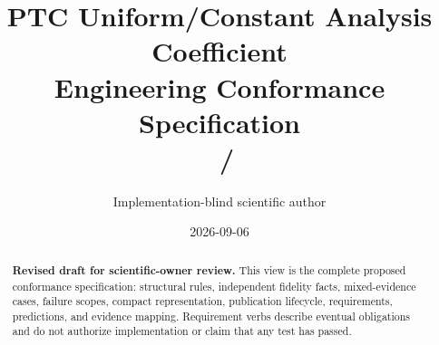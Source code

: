 \documentclass[10pt]{article}
\makeatletter
\def\ps@draftheadings{%
  \def\@oddhead{\normalfont\small Engineering Conformance Specification
    v0.1-draft.1/r0.4\hfil\thepage}%
  \let\@evenhead\@oddhead
  \def\@oddfoot{}\let\@evenfoot\@oddfoot}
\let\ps@plain\ps@draftheadings
\makeatother
\begin{document}
\makeatletter
\let\ps@plain\ps@draftheadings
\let\ps@headings\ps@draftheadings
\let\ps@myheadings\ps@draftheadings
\makeatother
\let\DraftOriginalThisPageStyle\thispagestyle
\renewcommand{\thispagestyle}[1]{\DraftOriginalThisPageStyle{draftheadings}}
\title{PTC Uniform/Constant Analysis Coefficient\\
Engineering Conformance Specification\\
\large \ContractIdentity\ \ContractVersion\ /\ \DocumentRevision}
\author{Implementation-blind scientific author}
\date{2026-09-06}
\newcommand{\ContractIdentity}{SCI-PTC-COEFFICIENT-UNIFORM}
\newcommand{\ContractVersion}{v0.1-draft.1}
\newcommand{\DocumentRevision}{r0.4}
\pagestyle{draftheadings}
\maketitle
\thispagestyle{draftheadings}
\begin{abstract}
\textbf{Revised draft for scientific-owner review.} This view is the complete
proposed conformance specification: structural rules, independent fidelity
facts, mixed-evidence cases, failure scopes, compact representation,
publication lifecycle, requirements, predictions, and evidence mapping.
Requirement verbs describe eventual obligations and do not authorize
implementation or claim that any test has passed.
\end{abstract}

\end{document}
